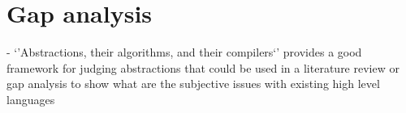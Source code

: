 \section{Gap analysis}
\label{sec:gap_analysis}
- `'Abstractions, their algorithms, and their compilers`' provides a good framework for judging abstractions that could be used in a literature review or gap analysis to show what are the subjective issues with existing high level languages